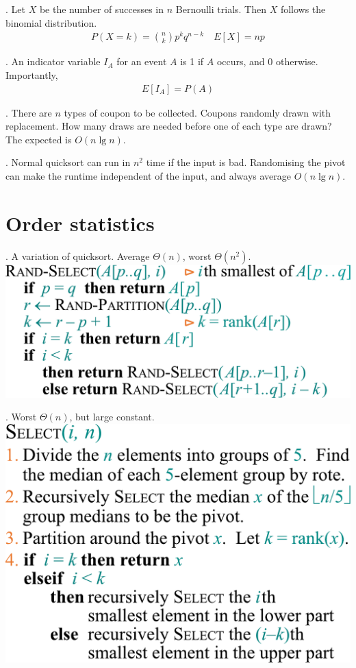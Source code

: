 \documentclass[fleqn]{slnotes}
\begin{document}
. Let \(X\) be the number of successes in \(n\) Bernoulli trials. Then \(X\) follows the binomial distribution. \begin{gather*}
P(X = k) = \binom{n}{k}p^k q^{n-k} \quad E[X] = np
\end{gather*}

. An indicator variable \(I_A\) for an event \(A\) is 1 if \(A\) occurs, and \(0\) otherwise. Importantly, \begin{gather*}
E[I_A] = P(A)
\end{gather*}

. There are \(n\) types of coupon to be collected. Coupons randomly drawn with replacement. How many draws are needed before one of each type are drawn? The expected is \(O(n \lg n)\).

. Normal quicksort can run in \(n^2\) time if the input is bad. Randomising the pivot can make the runtime independent of the input, and always average \(O(n \lg n)\).

\chapter{Order statistics}
. A variation of quicksort. Average \(\Theta(n)\), worst \(\Theta(n^2)\).\\
\includegraphics[width=\columnwidth]{rand-select.pdf}

. Worst \(\Theta(n)\), but large constant.\\
\includegraphics[width=0.8\columnwidth]{mom.pdf}
\end{document}
